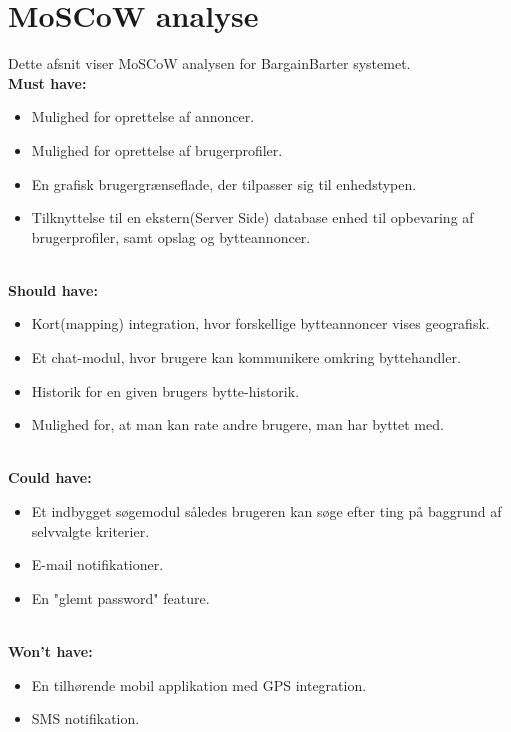 \chapter{MoSCoW analyse}
Dette afsnit viser MoSCoW analysen for BargainBarter systemet. \\
\textbf{Must have:}
\begin{itemize}[noitemsep]
	\item Mulighed for oprettelse af annoncer.
	\item Mulighed for oprettelse af brugerprofiler.
	\item En grafisk brugergrænseflade, der tilpasser sig til enhedstypen.
	\item Tilknyttelse til en ekstern(Server Side) database enhed til opbevaring af brugerprofiler, samt opslag og bytteannoncer.
	
\end{itemize}

\textbf{\\Should have:}
\begin{itemize}[noitemsep]
	\item Kort(mapping) integration, hvor forskellige bytteannoncer vises geografisk.
	\item Et chat-modul, hvor brugere kan kommunikere omkring byttehandler.
	\item Historik for en given brugers bytte-historik.
	\item Mulighed for, at man kan rate andre brugere, man har byttet med.
\end{itemize}

\textbf{\\Could have:}
\begin{itemize}[noitemsep]
	\item Et indbygget søgemodul således brugeren kan søge efter ting på baggrund af selvvalgte kriterier.
	\item E-mail notifikationer.
	\item En "glemt password" feature.
\end{itemize}

\textbf{\\Won't have:}
\begin{itemize}[noitemsep]
	\item En tilhørende mobil applikation med GPS integration.
	\item SMS notifikation.
\end{itemize}
